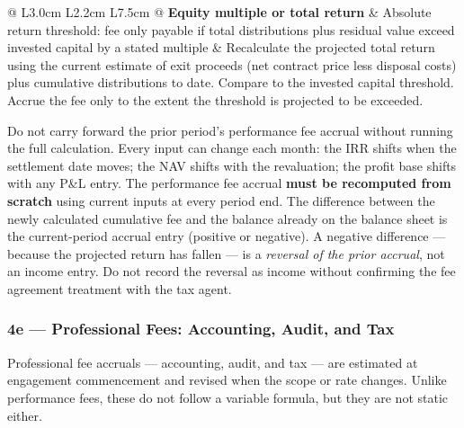 \documentclass[10pt,a4paper]{article}
\begin{document}
{\begin{longtable}{@{} L{3.0cm} L{2.2cm} L{7.5cm} @{}}
\textbf{Equity multiple or total return} & Absolute return threshold: fee only payable if total distributions plus residual value exceed invested capital by a stated multiple & Recalculate the projected total return using the current estimate of exit proceeds (net contract price less disposal costs) plus cumulative distributions to date. Compare to the invested capital threshold. Accrue the fee only to the extent the threshold is projected to be exceeded. \\
\bottomrule
\end{longtable}}

\begin{critical}
Do not carry forward the prior period's performance fee accrual without running the full calculation. Every input can change each month: the IRR shifts when the settlement date moves; the NAV shifts with the revaluation; the profit base shifts with any P\&L entry. The performance fee accrual \textbf{must be recomputed from scratch} using current inputs at every period end. The difference between the newly calculated cumulative fee and the balance already on the balance sheet is the current-period accrual entry (positive or negative). A negative difference --- because the projected return has fallen --- is a \emph{reversal of the prior accrual}, not an income entry. Do not record the reversal as income without confirming the fee agreement treatment with the tax agent.
\end{critical}


\subsubsection{4e --- Professional Fees: Accounting, Audit, and Tax}
\label{sec:grp4e}

Professional fee accruals --- accounting, audit, and tax --- are estimated at engagement commencement and revised when the scope or rate changes. Unlike performance fees, these do not follow a variable formula, but they are not static either.
\end{document}
